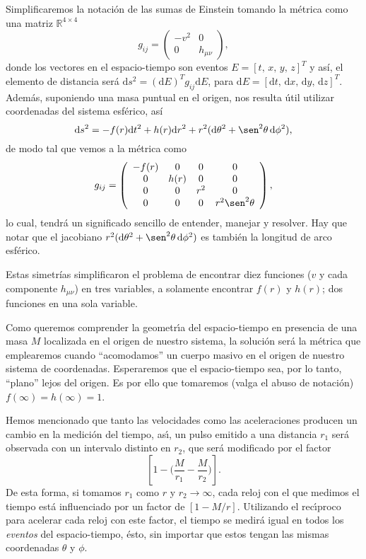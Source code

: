 \documentclass[12pt]{article}
\newcommand{\dx}{\textrm{d}}
\begin{document}
Simplificaremos la notación de las sumas de Einstein tomando la métrica como una matriz $\mathbb{R}^{4 \times 4}$
$$g_{ij}=\left(\begin{array}{cc}
     -v^2 & 0 \\
       0  & h_{\mu\nu}
  \end{array}\right),$$
donde los vectores en el espacio-tiempo son eventos $E = [t,\, x,\, y,\, z]^T$ y así, el elemento de distancia será $\dx s^2 = (\dx E)^T g_{ij} \dx E$, para $\dx E = [\dx t,\, \dx x,\, \dx y,\, \dx z]^T$. Además, suponiendo una masa puntual en el origen, nos resulta útil utilizar coordenadas del sistema esférico, así
\begin{equation}
\label{SW}
\dx s^2=-f(r)\dx t^2 + h(r)\dx r^2 + r^2(\dx \theta^2 + \sen^2\theta \, \dx\phi^2),
\end{equation}
de modo tal que vemos a la métrica como
$$g_{ij}=\left(\begin{array}{cccc}
     -f(r) &  0   &  0  & 0 \\
       0   & h(r) &  0  & 0 \\
       0   &  0   & r^2 & 0 \\
       0   &  0   &  0  & r^2\sen^2\theta
  \end{array}\right),$$
lo cual, tendrá un significado sencillo de entender, manejar y resolver. Hay que notar que el jacobiano  $r^2(\dx\theta^2 + \sen^2\theta \, \dx\phi^2)$ es tambi\'en la longitud de arco esf\'erico.

Estas simetrías simplificaron el problema de encontrar diez funciones ($v$ y cada componente $h_{\mu\nu}$) en tres variables, a solamente encontrar $f(r)$ y $h(r)$; dos funciones en una sola variable. 

Como queremos comprender la geometr\'{\i}a del espacio-tiempo en presencia de una masa $M$ localizada en el origen de nuestro sistema, la soluci\'on ser\'a la m\'etrica que emplearemos cuando ``acomodamos'' un cuerpo masivo en el origen de nuestro sistema de coordenadas. Esperaremos que el espacio-tiempo sea, por lo tanto, ``plano'' lejos del origen. Es por ello que tomaremos (valga el abuso de notaci\'on) $f(\infty) = h(\infty) = 1$.

Hemos mencionado que tanto las velocidades como las aceleraciones producen un cambio en la medici\'on del tiempo, as\'{\i}, un pulso emitido a una distancia $r_1$ ser\'a observada con un intervalo distinto en $r_2$, que ser\'a modificado por el factor
  $$\left[1 - \Big( \frac{M}{r_1} - \frac{M}{r_2} \Big) \right].$$
De esta forma, si tomamos $r_1$ como $r$ y $r_2\to\infty$, cada reloj con el que medimos el tiempo est\'a influenciado por un factor de $[1-M/r]$. Utilizando el rec\'{\i}proco para acelerar cada reloj con este factor, el tiempo se medir\'a igual en todos los {\it eventos} del espacio-tiempo, \'esto, sin importar que estos tengan las mismas coordenadas $\theta$ y $\phi$.
\end{document}
